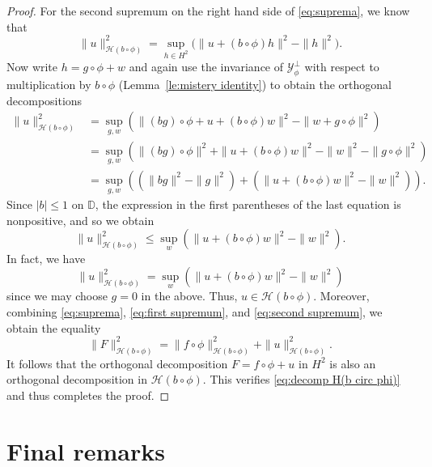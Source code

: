 \documentclass[11pt]{amsart}
\def\D{\mathbb{D}}
\def\HH{{\mathcal H}}
\def\YY{{\mathcal Y}}
\renewcommand{\leq}{\leqslant}
\numberwithin{equation}{section}
\theoremstyle{plain}
\theoremstyle{definition}
\begin{document}
\begin{proof}
	
 For the second supremum on the right hand side of \eqref{eq:suprema}, we know that 
	\[
	\| u\|_{\HH(b\circ\phi)}^2=\sup_{h \in H^2}\big( \| u+(b\circ\phi)h\|^2-\|h\|^2\big).
	\]
Now write $h=g\circ \phi+w$ and again use the invariance of $\YY_\phi^\perp$ with respect to multiplication by $b\circ\phi$ (Lemma~\ref{le:mistery identity})  to obtain the orthogonal decompositions
	\[
	\begin{split}
			\| u\|_{\HH(b\circ\phi)}^2&=\sup_{g,w} \left(\| (bg)\circ\phi+u+(b\circ \phi)w\|^2-\|w+g\circ\phi\|^2\right)\\
&		=\sup_{g,w} \left(\|(bg)\circ\phi\|^2+\| u+(b\circ\phi)w\|^2-\|w\|^2-\|g\circ\phi\|^2\right)\\
&=\sup_{g,w}\left((\|bg\|^2-\|g\|^2)+\left(\| u+(b\circ\phi)w\|^2-\|w\|^2\right)\right). 
	\end{split}
		\]
	Since $|b| \leq 1$ on $\D$, the expression in the first parentheses of the last equation is nonpositive, and so we obtain
		\[
			\| u\|_{\HH(b\circ\phi)}^2\leq \sup_w \left(\| u+(b\circ\phi)w\|^2-\|w\|^2\right) .
		\]
		In fact, we have 
	\begin{equation}\label{eq:second supremum}
			\| u\|_{\HH(b\circ\phi)}^2=\sup_w \left(\| u+(b\circ\phi)w\|^2-\|w\|^2\right)
	\end{equation}
	since we may choose $g=0$ in the above. Thus,  $ u\in \HH(b\circ\phi) $. Moreover, combining \eqref{eq:suprema}, \eqref{eq:first supremum}, and \eqref{eq:second supremum}, we obtain the equality
	\[
		\|F\|^2_{\mathcal{H}(b \circ \phi)}=\| f\circ\phi\|^2_{\HH(b\circ\phi)}+	\| u\|_{\HH(b\circ\phi)}^2.
	\]
	It follows that the orthogonal decomposition $F=f\circ\phi+u$  in $H^2$  is also an orthogonal decomposition in $\HH(b\circ\phi)$. This verifies \eqref{eq:decomp H(b circ phi)} and thus completes the proof. 
	\end{proof}
	







\section{Final remarks}\label{FRem}
\end{document}
